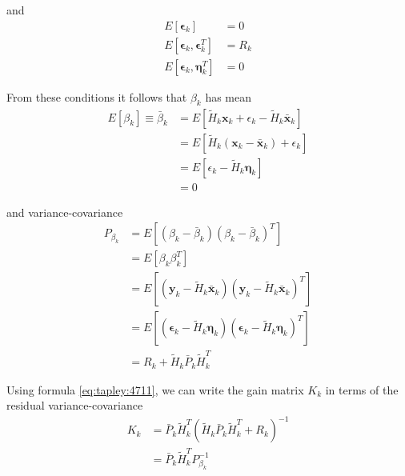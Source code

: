 and
\begin{equation}
  \begin{aligned}
  E \left[ \bm{\epsilon}_k \right] &= 0 \\
  E \left[ \bm{\epsilon}_k , \bm{\epsilon}^T_k \right] &= R_k \\
  E \left[ \bm{\epsilon}_k , \bm{\eta}^T_k \right] &= 0
  \end{aligned}
\end{equation}

From these conditions it follows that \(\beta _k\) has mean
\begin{equation}
  \begin{aligned}
    E \left[ \beta _k \right] \equiv \bar{\beta}_k &= E \left[
      \tilde{H}_k \bm{x}_k + \epsilon _k - \tilde{H}_k \bar{\bm{x}}_k \right] \\
    &= E \left[ \tilde{H}_k \left( \bm{x}_k - \bar{\bm{x}}_k \right) + \epsilon _k \right] \\
    & = E \left[ \epsilon _k - \tilde{H}_k \bm{\eta}_k \right] \\
    & = 0
  \end{aligned}
\end{equation}

and variance-covariance
\begin{equation}
  \begin{aligned}
    P_{\beta _k} &= 
      E \left[ \left( \beta _k - \bar{\beta}_k \right) \left( \beta _k - \bar{\beta}_k \right)^T \right] \\
    & = E \left[ \beta _k {\beta}^T_k \right] \\
    & = E \left[ \left( \bm{y}_k - \tilde{H}_k \bar{\bm{x}}_k \right) 
      \left( \bm{y}_k - \tilde{H}_k \bar{\bm{x}}_k \right)^T \right] \\
    & = E \left[ \left( \bm{\epsilon}_k - \tilde{H}_k \bm{\eta}_k \right)
      \left( \bm{\epsilon}_k - \tilde{H}_k \bm{\eta}_k \right)^T \right] \\
    & = R_k + \tilde{H}_k \bar{P}_k \tilde{H}^T_k
  \end{aligned}
\end{equation}

Using formula \ref{eq:tapley:4711}, we can write the gain matrix \(K_k\) in terms 
of the residual variance-covariance
\begin{equation}
  \begin{aligned}
  K_k &= 
    \bar{P}_k \tilde{H}^T_k \left( \tilde{H}_k \bar{P}_k \tilde{H}^T_k + R_k \right) ^{-1} \\
  &=
    \bar{P}_k \tilde{H}^T_k P_{\beta _k}^{-1}
  \end{aligned}
\end{equation}


